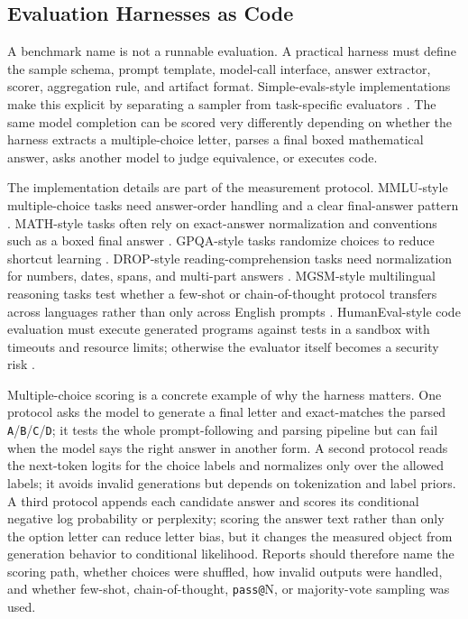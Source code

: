 \subsection{Evaluation Harnesses as Code}
A benchmark name is not a runnable evaluation. A practical harness must define the sample schema, prompt template, model-call interface, answer extractor, scorer, aggregation rule, and artifact format. Simple-evals-style implementations make this explicit by separating a sampler from task-specific evaluators \cite{openai2024simpleevals}. The same model completion can be scored very differently depending on whether the harness extracts a multiple-choice letter, parses a final boxed mathematical answer, asks another model to judge equivalence, or executes code.

The implementation details are part of the measurement protocol. MMLU-style multiple-choice tasks need answer-order handling and a clear final-answer pattern \cite{hendrycks2020measuring}. MATH-style tasks often rely on exact-answer normalization and conventions such as a boxed final answer \cite{hendrycks2021math}. GPQA-style tasks randomize choices to reduce shortcut learning \cite{rein2023gpqa}. DROP-style reading-comprehension tasks need normalization for numbers, dates, spans, and multi-part answers \cite{dua2019drop}. MGSM-style multilingual reasoning tasks test whether a few-shot or chain-of-thought protocol transfers across languages rather than only across English prompts \cite{shi2022mgsm}. HumanEval-style code evaluation must execute generated programs against tests in a sandbox with timeouts and resource limits; otherwise the evaluator itself becomes a security risk \cite{chen2021codex}.

Multiple-choice scoring is a concrete example of why the harness matters. One protocol asks the model to generate a final letter and exact-matches the parsed \texttt{A}/\texttt{B}/\texttt{C}/\texttt{D}; it tests the whole prompt-following and parsing pipeline but can fail when the model says the right answer in another form. A second protocol reads the next-token logits for the choice labels and normalizes only over the allowed labels; it avoids invalid generations but depends on tokenization and label priors. A third protocol appends each candidate answer and scores its conditional negative log probability or perplexity; scoring the answer text rather than only the option letter can reduce letter bias, but it changes the measured object from generation behavior to conditional likelihood. Reports should therefore name the scoring path, whether choices were shuffled, how invalid outputs were handled, and whether few-shot, chain-of-thought, \texttt{pass@}N, or majority-vote sampling was used.

